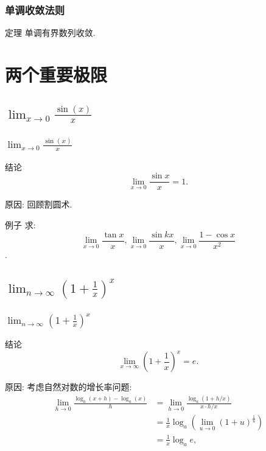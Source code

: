 \documentclass[
10pt,  
aspectratio=43,  
]{beamer}
\begin{document}
\begin{frame}
\frametitle{单调收敛法则}
\begin{block}{定理}
单调有界数列收敛.
\end{block}

\end{frame}

\section{两个重要极限}
\subsection{$\lim_{x\to0}\frac{\sin(x)}{x}$}

\begin{frame}
\frametitle{$\lim_{x\to0}\frac{\sin(x)}{x}$}
\begin{block}{结论}
$$
\lim _{x \rightarrow 0} \frac{\sin x}{x}=1.
$$
\end{block}
原因: 回顾割圆术.

\begin{exampleblock}{例子}
求:  $$\displaystyle\lim _{x \rightarrow 0} \frac{\tan x}{x},   \lim_{x \rightarrow 0} \frac{\sin k x}{x},   \lim _{x\rightarrow 0} \frac{1-\cos x}{x^2}$$.
\end{exampleblock}

\end{frame}

\subsection{$\lim_{n\to\infty}\left(1+\frac1x\right)^x$}

\begin{frame}
\frametitle{$\lim_{n\to\infty}\left(1+\frac1x\right)^x$}
\begin{block}{结论}
$$
\lim _{x \rightarrow \infty}\left(1+\frac{1}{x}\right)^x=e.
$$
\end{block}
原因: 考虑自然对数的增长率问题: 
\begin{equation*}
\begin{aligned}
\lim _{h \rightarrow 0} \frac{\log _a(x+h)-\log _a(x)}{h}& =\lim _{h \rightarrow 0} \frac{\log _a(1+h / x)}{x \cdot h / x} \\
& =\frac{1}{x} \log _a\left(\lim _{u \rightarrow 0}(1+u)^{\frac{1}{u}}\right) \\
& =\frac{1}{x} \log _a e,  
\end{aligned}
\end{equation*}
\end{frame}
\end{document}

